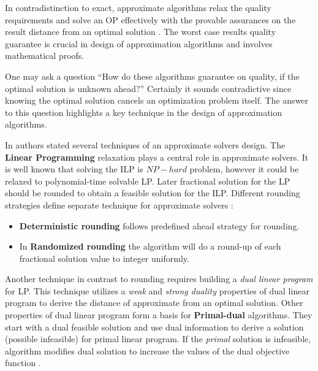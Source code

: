 In contradistinction to exact, approximate algorithms relax the quality requirements and solve an OP effectively with the provable assurances on the result distance from an optimal solution \cite{williamson2011design}. The worst case results quality guarantee is crucial in design of approximation algorithms and involves mathematical proofs. 

One may ask a question ``How do these algorithms guarantee on quality, if the optimal solution is unknown ahead?'' Certainly it sounds contradictive since knowing the optimal solution cancels an optimization problem itself. The answer to this question highlights a key technique in the design of approximation algorithms.

In \cite{williamson2011design} authors stated several techniques of an approximate solvers design. The \textbf{Linear Programming} relaxation plays a central role in approximate solvers. It is well known that solving the ILP is $NP-hard$ problem, however it could be relaxed to polynomial-time solvable LP. %
Later fractional solution for the LP should be rounded to obtain a feasible solution for the ILP. %
Different rounding strategies define separate technique for approximate solvers \cite{williamson2011design}: 
\begin{itemize}
	\item \textbf{Deterministic rounding} follows predefined ahead strategy for rounding.
	\item In \textbf{Randomized rounding} the algorithm will do a round-up of each fractional solution value to integer uniformly.
\end{itemize}

Another technique in contrast to rounding requires building a \textit{dual linear program} for LP. This technique utilizes a \textit{weak} and \textit{strong duality} properties of dual linear program to derive the distance of approximate from an optimal solution. Other properties of dual linear program form a basis for \textbf{Primal-dual} algorithms. They start with a dual feasible solution and use dual information to derive a solution (possible infeasible) for primal linear program. If the \textit{primal} solution is infeasible, algorithm modifies dual solution to increase the values of the dual objective function \cite{williamson2011design}. 

